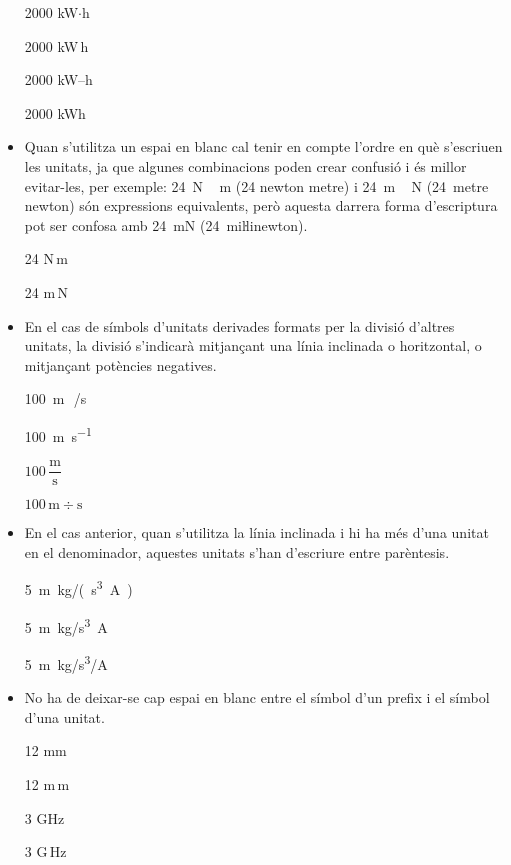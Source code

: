 \begin{itemize}
\textcolor{Green}\faCheckSquare{} 2000 kW$\cdot$h

\textcolor{Green}\faCheckSquare{} 2000 kW\,h

\textcolor{Red}\faTimesCircle{} 2000 kW--h

\textcolor{Red}\faTimesCircle{} 2000 kWh

\item Quan s'utilitza un espai en blanc cal tenir en compte  l'ordre en què s'escriuen
les unitats, ja que algunes combinacions poden crear confusió i
és millor evitar-les, per exemple: \qty{24}{N\,m} (24 newton metre) i
\qty{24}{m\,N} (24~metre newton) són expressions equivalents, però
aquesta darrera forma d'escriptura pot ser confosa amb \qty{24}{mN} (24~miŀlinewton).

\textcolor{Green}\faCheckSquare{} 24 N\,m

\textcolor{Blue}\faExclamationTriangle{} 24 m\,N

\item En el cas de símbols d'unitats derivades formats per la divisió
d'altres unitats, la divisió s'indicarà mitjançant una línia
inclinada o horitzontal, o mitjançant potències negatives.

\textcolor{Green}\faCheckSquare{} \qty{100}{m\,/s}

\textcolor{Green}\faCheckSquare{} \qty{100}{m.s^{-1}}

\textcolor{Green}\faCheckSquare{} $100\,\dfrac{\text{m}}{\text{s}}$

\textcolor{Red}\faTimesCircle{} $100\,\text{m}\div\text{s}$

\item En el cas anterior, quan s'utilitza la línia inclinada i hi ha més
d'una unitat en el denominador, aquestes unitats s'han d'escriure
entre parèntesis.

\textcolor{Green}\faCheckSquare{} \qty{5}{m.kg/(s^3.A)}

\textcolor{Red}\faTimesCircle{} \qty{5}{m.kg/s^3.A}

\textcolor{Red}\faTimesCircle{} \qty{5}{m.kg/s^3/A}


\item No ha de deixar-se cap espai en blanc entre el símbol d'un prefix i
el símbol d'una unitat.

\textcolor{Green}\faCheckSquare{} 12 mm

\textcolor{Red}\faTimesCircle{} 12 m\,m

\textcolor{Green}\faCheckSquare{}  3 GHz

\textcolor{Red}\faTimesCircle{}  3 G\,Hz



\end{itemize}
